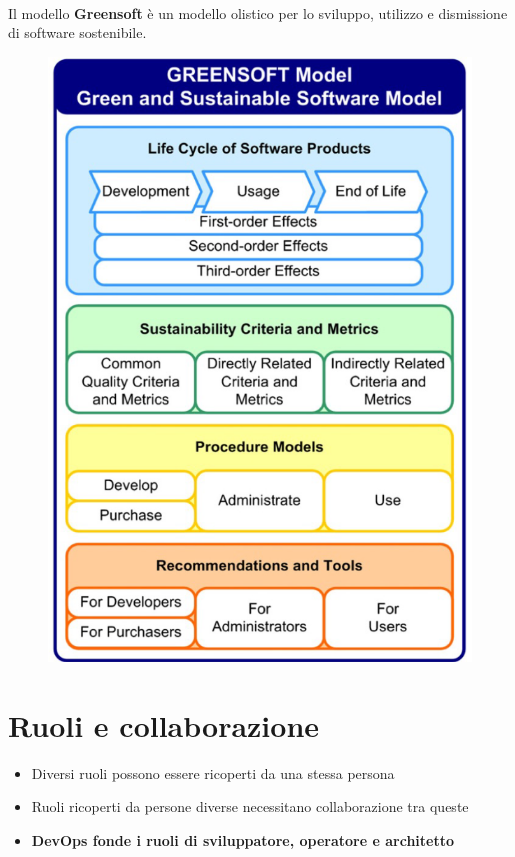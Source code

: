 \documentclass[a4paper, 12pt]{report}
\begin{document}
          \paragraph{}Il modello \textbf{Greensoft} è un modello olistico per lo sviluppo, utilizzo e dismissione di software sostenibile.
          \begin{figure}[htbp]
            \centering
            \includegraphics[scale=0.4]{Immagini/Greensoft.png}
          \end{figure}
          \section{Ruoli e collaborazione}
          \begin{itemize}
            \item Diversi ruoli possono essere ricoperti da una stessa persona
            \item Ruoli ricoperti da persone diverse necessitano collaborazione tra queste
            \item \textbf{DevOps fonde i ruoli di sviluppatore, operatore e architetto}
          \end{itemize}
\end{document}
